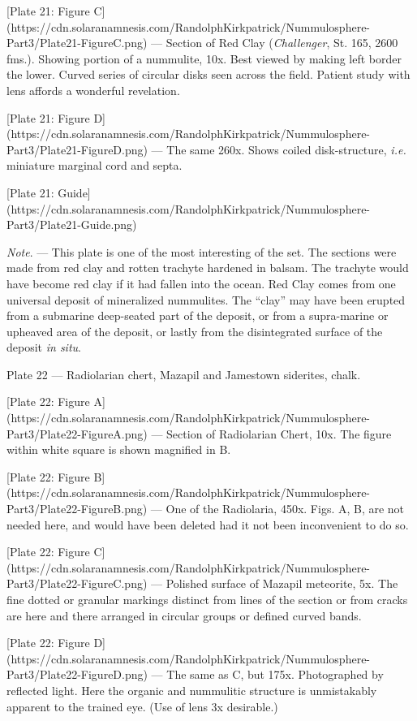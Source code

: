 \documentclass[a4paper, 12pt, oneside]{article}
\begin{document}
[Plate 21: Figure C](https://cdn.solaranamnesis.com/RandolphKirkpatrick/Nummulosphere-Part3/Plate21-FigureC.png) --- Section of Red Clay (\emph{Challenger}, St. 165, 2600 fms.). Showing portion of a nummulite, 10x. Best viewed by making left border the lower. Curved series of circular disks seen across the field. Patient study with lens affords a wonderful revelation.

[Plate 21: Figure D](https://cdn.solaranamnesis.com/RandolphKirkpatrick/Nummulosphere-Part3/Plate21-FigureD.png) --- The same 260x. Shows coiled disk-structure, \emph{i.e.} miniature marginal cord and septa.

[Plate 21: Guide](https://cdn.solaranamnesis.com/RandolphKirkpatrick/Nummulosphere-Part3/Plate21-Guide.png)

\emph{Note}. --- This plate is one of the most interesting of the set. The sections were made from red clay and rotten trachyte hardened in balsam. The trachyte would have become red clay if it had fallen into the ocean. Red Clay comes from one universal deposit of mineralized nummulites. The ``clay'' may have been erupted from a submarine deep-seated part of the deposit, or from a supra-marine or upheaved area of the deposit, or lastly from the disintegrated surface of the deposit \emph{in situ}.

Plate 22 --- Radiolarian chert, Mazapil and Jamestown siderites, chalk.

[Plate 22: Figure A](https://cdn.solaranamnesis.com/RandolphKirkpatrick/Nummulosphere-Part3/Plate22-FigureA.png) --- Section of Radiolarian Chert, 10x. The figure within white square is shown magnified in B.

[Plate 22: Figure B](https://cdn.solaranamnesis.com/RandolphKirkpatrick/Nummulosphere-Part3/Plate22-FigureB.png) --- One of the Radiolaria, 450x. Figs. A, B, are not needed here, and would have been deleted had it not been inconvenient to do so.

[Plate 22: Figure C](https://cdn.solaranamnesis.com/RandolphKirkpatrick/Nummulosphere-Part3/Plate22-FigureC.png) --- Polished surface of Mazapil meteorite, 5x. The fine dotted or granular markings distinct from lines of the section or from cracks are here and there arranged in circular groups or defined curved bands.

[Plate 22: Figure D](https://cdn.solaranamnesis.com/RandolphKirkpatrick/Nummulosphere-Part3/Plate22-FigureD.png) --- The same as C, but 175x. Photographed by reflected light. Here the organic and nummulitic structure is unmistakably apparent to the trained eye. (Use of lens 3x desirable.)
\end{document}
